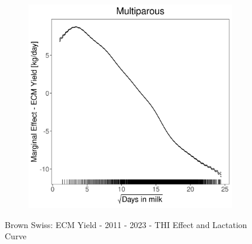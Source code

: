 \begin{figure}[H]
\begin{subfigure}[b]{0.45\textwidth}
    \end{subfigure}
    \hspace{0.05\textwidth} %
    \begin{subfigure}[b]{0.45\textwidth}
        \centering
        \includegraphics[width=\textwidth]{thesis/figures/models/ecm/after2010/bs_ecm_after2010/bs_ecm_after2010_marginal_dim_milk_multi.png}
    \end{subfigure}
    \caption[]{Brown Swiss: ECM Yield - 2011 - 2023 - THI Effect and Lactation Curve}
    \label{fig:main}
\end{figure}
